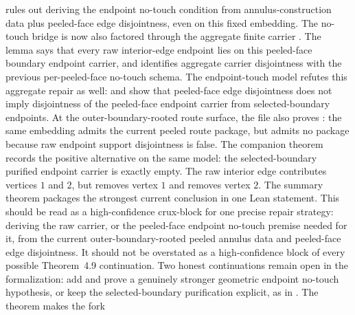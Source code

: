 \documentclass[11pt]{article}
\begin{document}
rules out deriving the endpoint no-touch condition from annulus-construction
data plus peeled-face edge disjointness, even on this fixed embedding.
The no-touch bridge is now also factored through the aggregate finite carrier
.  The lemma
says that every raw interior-edge endpoint lies on this peeled-face boundary
endpoint carrier, and
 identifies
aggregate carrier disjointness with the previous per-peeled-face no-touch
schema.  The endpoint-touch model refutes this aggregate repair as well:
and
show that peeled-face edge disjointness does not imply disjointness of the
peeled-face endpoint carrier from selected-boundary endpoints.
At the outer-boundary-rooted route surface, the file also proves
:
the same embedding admits the current peeled route package, but admits no
package because raw endpoint support disjointness is false.
The companion theorem
records the positive alternative on the same model: the selected-boundary
purified endpoint carrier is exactly empty.  The raw interior edge contributes
vertices \(1\) and \(2\), but  removes vertex \(1\) and
 removes vertex \(2\).
The summary theorem
 packages the
strongest current conclusion in one Lean statement.  This should be read as a
high-confidence crux-block for one precise repair strategy: deriving the raw
 carrier, or the peeled-face endpoint
no-touch premise needed for it, from the current outer-boundary-rooted peeled
annulus data and peeled-face edge disjointness.  It should not be overstated
as a high-confidence block of every possible Theorem~4.9 continuation.  Two
honest continuations remain open in the formalization: add and prove a
genuinely stronger geometric endpoint no-touch hypothesis, or keep the
selected-boundary purification explicit, as in
.
The theorem  makes the fork
\end{document}
